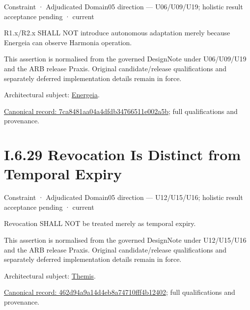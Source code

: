 \label{element:7ca8481aa04a4dfdb34766511e002a5b}
{\small Constraint · Adjudicated Domain05 direction — U06/U09/U19; holistic result acceptance pending · current}\par

R1.x/R2.x SHALL NOT introduce autonomous adaptation merely because Energeia can observe Harmonia operation.



This assertion is normalised from the governed DesignNote under U06/U09/U19 and the ARB release Praxis. Original candidate/release qualifications and separately deferred implementation details remain in force.



Architectural subject: \hyperref[element:fb3f37a6ac614415ac486a6de9d35994]{Energeia}.


{\footnotesize \href{../../../../continuum/motivation/constraint/7ca8481aa04a4dfdb34766511e002a5b.md}{Canonical record: 7ca8481aa04a4dfdb34766511e002a5b}; full qualifications and provenance.}\par
\section*{I.6.29 Revocation Is Distinct from Temporal Expiry}
\label{navigation:I.6.29}

\label{element:462d94a9a14d4eb8a74710fff4b12402}
{\small Constraint · Adjudicated Domain05 direction — U12/U15/U16; holistic result acceptance pending · current}\par

Revocation SHALL NOT be treated merely as temporal expiry.



This assertion is normalised from the governed DesignNote under U12/U15/U16 and the ARB release Praxis. Original candidate/release qualifications and separately deferred implementation details remain in force.



Architectural subject: \hyperref[element:899d34ec491948b68aad09e507dea6d1]{Themis}.


{\footnotesize \href{../../../../continuum/motivation/constraint/462d94a9a14d4eb8a74710fff4b12402.md}{Canonical record: 462d94a9a14d4eb8a74710fff4b12402}; full qualifications and provenance.}\par
